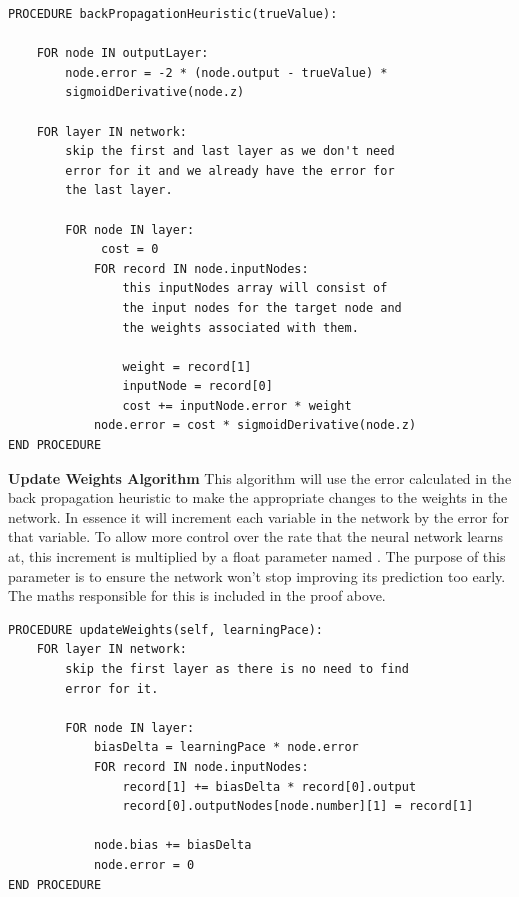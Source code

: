 \documentclass{report}
\begin{document}
\begin{verbatim}
PROCEDURE backPropagationHeuristic(trueValue):
        
    FOR node IN outputLayer:
        node.error = -2 * (node.output - trueValue) *
        sigmoidDerivative(node.z)
        
    FOR layer IN network:
        skip the first and last layer as we don't need 
        error for it and we already have the error for 
        the last layer.
        
        FOR node IN layer:
             cost = 0
            FOR record IN node.inputNodes:
                this inputNodes array will consist of                     
                the input nodes for the target node and
                the weights associated with them.
                    
                weight = record[1]
                inputNode = record[0]
                cost += inputNode.error * weight
            node.error = cost * sigmoidDerivative(node.z)
END PROCEDURE
\end{verbatim}

\noindent\textbf{Update Weights Algorithm}
\newline
This algorithm will use the error calculated in the back propagation heuristic to make the appropriate changes to the weights in the network. In essence it will increment each variable in the network by the error for that variable. To allow more control over the rate that the neural network learns at, this increment is multiplied by a float parameter named . The purpose of this parameter is to ensure the network won't stop improving its prediction too early.
\newline
The maths responsible for this is included in the proof above.
\begin{verbatim}
PROCEDURE updateWeights(self, learningPace):
    FOR layer IN network:
        skip the first layer as there is no need to find 
        error for it.
        
        FOR node IN layer:
            biasDelta = learningPace * node.error
            FOR record IN node.inputNodes:
                record[1] += biasDelta * record[0].output
                record[0].outputNodes[node.number][1] = record[1]

            node.bias += biasDelta
            node.error = 0
END PROCEDURE
\end{verbatim}
\newpage
\end{document}
